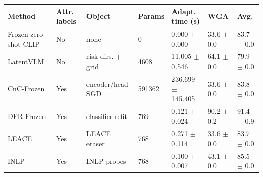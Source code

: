 \begin{tabular}{lllllll}
\toprule
Method & Attr. labels & Object & Params & Adapt. time (s) & WGA & Avg. \\
\midrule
Frozen zero-shot CLIP & No & none & 0 & 0.000 $\pm$ 0.000 & 33.6 $\pm$ 0.0 & 83.7 $\pm$ 0.0 \\
LatentVLM & No & risk dirs. + grid & 4608 & 11.005 $\pm$ 0.546 & 64.1 $\pm$ 0.0 & 79.9 $\pm$ 0.0 \\
CnC-Frozen & Yes & encoder/head SGD & 591362 & 236.699 $\pm$ 145.405 & 33.6 $\pm$ 0.0 & 83.8 $\pm$ 0.0 \\
DFR-Frozen & Yes & classifier refit & 769 & 0.121 $\pm$ 0.024 & 90.2 $\pm$ 0.2 & 91.4 $\pm$ 0.9 \\
LEACE & Yes & LEACE eraser & 768 & 0.271 $\pm$ 0.114 & 33.6 $\pm$ 0.0 & 83.7 $\pm$ 0.0 \\
INLP & Yes & INLP probes & 768 & 0.100 $\pm$ 0.007 & 43.1 $\pm$ 0.0 & 85.5 $\pm$ 0.0 \\
\bottomrule
\end{tabular}
